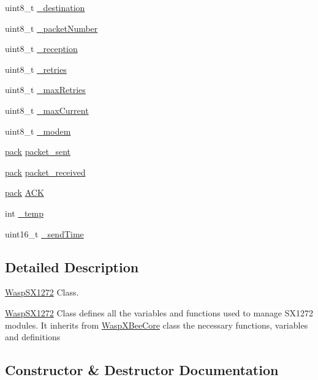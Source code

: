 \begin{DoxyCompactItemize}
\item 
uint8\+\_\+t \hyperlink{class_wasp_s_x1272_a85c9daae64a5291ea033aab2c9eb4c80}{\+\_\+destination}
\item 
uint8\+\_\+t \hyperlink{class_wasp_s_x1272_addd7b2be1fcda591c3df8e470b2e82f0}{\+\_\+packet\+Number}
\item 
uint8\+\_\+t \hyperlink{class_wasp_s_x1272_a4025d018b1337cdd681e6e2a855179d4}{\+\_\+reception}
\item 
uint8\+\_\+t \hyperlink{class_wasp_s_x1272_a446b8d3764d930f490508e03d603f28a}{\+\_\+retries}
\item 
uint8\+\_\+t \hyperlink{class_wasp_s_x1272_a96e8d83e71cde36dde2cbeeeb1db4f86}{\+\_\+max\+Retries}
\item 
uint8\+\_\+t \hyperlink{class_wasp_s_x1272_a7a4e718645c2ff60ddea7bbcb530b6d2}{\+\_\+max\+Current}
\item 
uint8\+\_\+t \hyperlink{class_wasp_s_x1272_ac90e11a42677f2fff97ab2caa3a4c676}{\+\_\+modem}
\item 
\hyperlink{structpack}{pack} \hyperlink{class_wasp_s_x1272_aa318dbc9060a067fb925926cd3545366}{packet\+\_\+sent}
\item 
\hyperlink{structpack}{pack} \hyperlink{class_wasp_s_x1272_a43eb11f317cfd60607e2d00a5515f5d7}{packet\+\_\+received}
\item 
\hyperlink{structpack}{pack} \hyperlink{class_wasp_s_x1272_ad87e372f185c7c5fd312dd8323d91c95}{A\+CK}
\item 
int \hyperlink{class_wasp_s_x1272_ab9473d933d186b09be966fe005be1391}{\+\_\+temp}
\item 
uint16\+\_\+t \hyperlink{class_wasp_s_x1272_a5074331b975a265eeae0235edd6da59d}{\+\_\+send\+Time}
\end{DoxyCompactItemize}


\subsection{Detailed Description}
\hyperlink{class_wasp_s_x1272}{Wasp\+S\+X1272} Class. 

\hyperlink{class_wasp_s_x1272}{Wasp\+S\+X1272} Class defines all the variables and functions used to manage S\+X1272 modules. It inherits from \textquotesingle{}\hyperlink{class_wasp_x_bee_core}{Wasp\+X\+Bee\+Core}\textquotesingle{} class the necessary functions, variables and definitions 

\subsection{Constructor \& Destructor Documentation}
